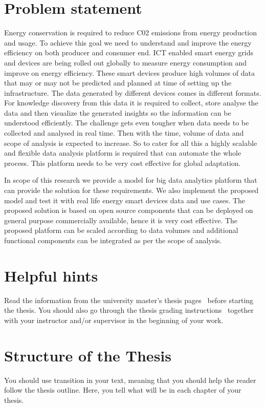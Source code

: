 \section{Problem statement}

Energy conservation is required to reduce C02 emissions from energy production and usage. To achieve this goal we need to understand and improve the energy efficiency on both producer and consumer end. ICT enabled smart energy grids and devices are being rolled out globally to measure energy consumption and improve on energy efficiency. These smart devices produce high volumes of data that may or may not be predicted and planned at time of setting up the infrastructure. The data generated by different devices comes in different formats. For knowledge discovery from this data it is required to collect, store analyse the data and then visualize the generated insights so the information can be understood efficiently. The challenge gets even tougher when data needs to be collected and analysed in real time. Then with the time, volume of data and scope of analysis is expected to increase. So to cater for all this a highly scalable and flexible data analysis platform is required that can automate the whole process. This platform needs to be very cost effective for global adaptation.
 
In scope of this research we provide a model for big data analytics platform that can provide the solution for these requirements. We also implement the proposed model and test it with real life energy smart devices data and use cases. The proposed solution is based on open source components that can be deployed on general purpose commercially available, hence it is very cost effective. The proposed platform can be scaled according to data volumes and additional functional components can be integrated as per the scope of analysis.


\section{Helpful hints}

Read the information from the university master's thesis
pages~\cite{ThesisInstructions} before starting the thesis.  You
should also go through the thesis grading
instructions~\cite{ThesisGrading} together with your instructor and/or
supervisor in the beginning of your work.

\section{Structure of the Thesis}
\label{section:structure} 

You should use transition in your text, meaning that you should help
the reader follow the thesis outline. Here, you tell what will be in
each chapter of your thesis. 

